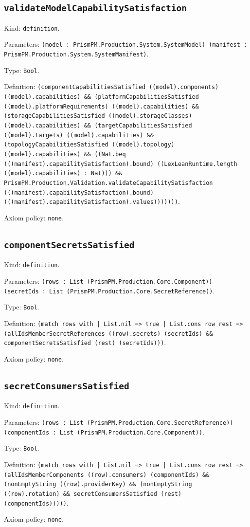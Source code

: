 \documentclass[11pt]{article}
\begin{document}
\subsection*{\texttt{validateModelCapabilitySatisfaction}}
\noindent Kind: \texttt{definition}.\par
\noindent Parameters: \texttt{(model : PrismPM.Production.System.SystemModel) (manifest : PrismPM.Production.System.SystemManifest)}.\par
\noindent Type: \texttt{Bool}.\par
\noindent Definition: \texttt{(componentCapabilitiesSatisfied ((model).components) ((model).capabilities) \&\& (platformCapabilitiesSatisfied ((model).platformRequirements) ((model).capabilities) \&\& (storageCapabilitiesSatisfied ((model).storageClasses) ((model).capabilities) \&\& (targetCapabilitiesSatisfied ((model).targets) ((model).capabilities) \&\& (topologyCapabilitiesSatisfied ((model).topology) ((model).capabilities) \&\& ((Nat.beq (((manifest).capabilitySatisfaction).bound) ((LexLeanRuntime.length ((model).capabilities) : Nat))) \&\& PrismPM.Production.Validation.validateCapabilitySatisfaction (((manifest).capabilitySatisfaction).bound) (((manifest).capabilitySatisfaction).values)))))))}.\par
\noindent Axiom policy: \texttt{none}.\par
\subsection*{\texttt{componentSecretsSatisfied}}
\noindent Kind: \texttt{definition}.\par
\noindent Parameters: \texttt{(rows : List (PrismPM.Production.Core.Component)) (secretIds : List (PrismPM.Production.Core.SecretReference))}.\par
\noindent Type: \texttt{Bool}.\par
\noindent Definition: \texttt{(match rows with | List.nil => true | List.cons row rest => (allIdsMemberSecretReferences ((row).secrets) (secretIds) \&\& componentSecretsSatisfied (rest) (secretIds)))}.\par
\noindent Axiom policy: \texttt{none}.\par
\subsection*{\texttt{secretConsumersSatisfied}}
\noindent Kind: \texttt{definition}.\par
\noindent Parameters: \texttt{(rows : List (PrismPM.Production.Core.SecretReference)) (componentIds : List (PrismPM.Production.Core.Component))}.\par
\noindent Type: \texttt{Bool}.\par
\noindent Definition: \texttt{(match rows with | List.nil => true | List.cons row rest => (allIdsMemberComponents ((row).consumers) (componentIds) \&\& (nonEmptyString ((row).providerKey) \&\& (nonEmptyString ((row).rotation) \&\& secretConsumersSatisfied (rest) (componentIds)))))}.\par
\noindent Axiom policy: \texttt{none}.\par
\end{document}
